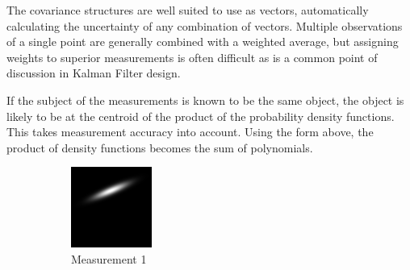 \documentclass{article}
\newcounter{subsubsubsection}[subsubsection]
\begin{document}
        The covariance structures are well suited to use as vectors, automatically calculating the uncertainty of any combination of vectors. 
        Multiple observations of a single point are generally combined with a weighted average, but assigning weights to superior measurements is often difficult as is a common point of discussion in Kalman Filter design.
        
        If the subject of the measurements is known to be the same object, the object is likely to be at the centroid of the product of the probability density functions.  This takes measurement accuracy into account.
        Using the form above, the product of density functions becomes the sum of polynomials.
        \begin{figure}
        \centering
        \begin{subfigure}{.3\textwidth}
          \centering
          \includegraphics[width=.8\linewidth]{images/GaussianLine1.png}
          \caption{Measurement 1}
          \label{fig:uncProdsub1}
        \end{subfigure}%
        \begin{subfigure}{.3\textwidth}
          \centering

\end{subfigure}
\end{figure}
\end{document}
